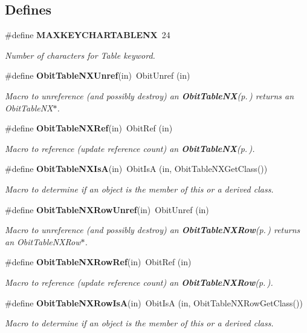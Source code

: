 \subsection*{Defines}
\begin{CompactItemize}
\item 
\#define {\bf MAXKEYCHARTABLENX}\ 24
\begin{CompactList}\small\item\em Number of characters for Table keyword. \item\end{CompactList}\item 
\#define {\bf Obit\-Table\-NXUnref}(in)\ Obit\-Unref (in)
\begin{CompactList}\small\item\em Macro to unreference (and possibly destroy) an {\bf Obit\-Table\-NX}{\rm (p.\,\pageref{structObitTableNX})} returns an Obit\-Table\-NX$\ast$. \item\end{CompactList}\item 
\#define {\bf Obit\-Table\-NXRef}(in)\ Obit\-Ref (in)
\begin{CompactList}\small\item\em Macro to reference (update reference count) an {\bf Obit\-Table\-NX}{\rm (p.\,\pageref{structObitTableNX})}. \item\end{CompactList}\item 
\#define {\bf Obit\-Table\-NXIs\-A}(in)\ Obit\-Is\-A (in, Obit\-Table\-NXGet\-Class())
\begin{CompactList}\small\item\em Macro to determine if an object is the member of this or a derived class. \item\end{CompactList}\item 
\#define {\bf Obit\-Table\-NXRow\-Unref}(in)\ Obit\-Unref (in)
\begin{CompactList}\small\item\em Macro to unreference (and possibly destroy) an {\bf Obit\-Table\-NXRow}{\rm (p.\,\pageref{structObitTableNXRow})} returns an Obit\-Table\-NXRow$\ast$. \item\end{CompactList}\item 
\#define {\bf Obit\-Table\-NXRow\-Ref}(in)\ Obit\-Ref (in)
\begin{CompactList}\small\item\em Macro to reference (update reference count) an {\bf Obit\-Table\-NXRow}{\rm (p.\,\pageref{structObitTableNXRow})}. \item\end{CompactList}\item 
\#define {\bf Obit\-Table\-NXRow\-Is\-A}(in)\ Obit\-Is\-A (in, Obit\-Table\-NXRow\-Get\-Class())
\begin{CompactList}\small\item\em Macro to determine if an object is the member of this or a derived class. \item\end{CompactList}\end{CompactItemize}

